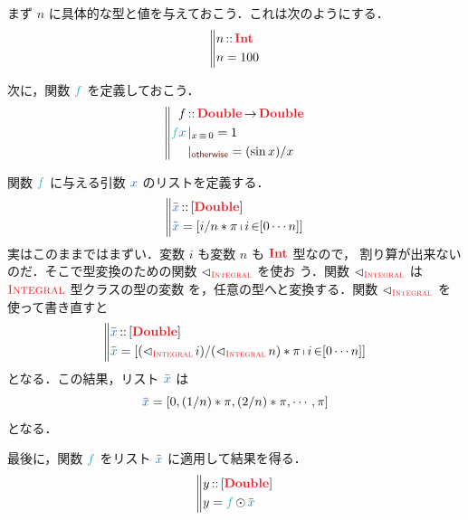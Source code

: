 \documentclass[a5paper,twoside,fleqn,draft]{jsbook}
\begin{document}
まず $n$ に具体的な型と値を与えておこう．これは次のようにする．
\begin{equation}
\left\mBrace
\begin{aligned}
n&\hIsTypeOf\hInt\\
n&=100
\end{aligned}
\right.
\end{equation}

次に，関数 $\hFunc{f}$ を定義しておこう．
\begin{equation}
\left\mBrace
\begin{aligned}
f&\hIsTypeOf\mProjEXP{\hDouble}{\hDouble}\\
\hFunc{f}\hVar{x}&\hGuard{x\hIfEq0}=1\\
&\hGuard{\hOtherwise}=(\sin x)/x
\end{aligned}
\right.
\end{equation}

関数 $\hFunc{f}$ に与える引数 $\hVar{x}$ のリストを定義する．
\begin{equation*}
  \left\mBrace
  \begin{aligned}
    \hListVarWith{x}
    &\hIsTypeOf{}[\hDouble]\\
    \hListVarWith{x}
    &=[i/n*\pi\mListComp i\mFrom[0\dotsb n]]
  \end{aligned}
  \right.
\end{equation*}
実はこのままではまずい．変数 $i$ も変数 $n$ も $\hInt$ 型なので，
割り算が出来ないのだ．そこで型変換のための関数 $\hFromIntegral$ を使お
う．関数 $\hFromIntegral$ は $\hIntegral$ 型クラスの型の変数
を，任意の型へと変換する．関数 $\hFromIntegral$ を使って書き直すと
\begin{equation}
  \left\mBrace
  \begin{aligned}
    \hListVarWith{x}
    &\hIsTypeOf{}[\hDouble]\\
    \hListVarWith{x}
    &=[(\hFromIntegral i)/(\hFromIntegral n)*\pi\mListComp i\mFrom[0\dotsb n]]
  \end{aligned}
  \right.
\end{equation}
となる．この結果，リスト $\hListVarWith{x}$ は
\begin{equation}
  \hListVarWith{x}
  =[0,(1/n)*\pi,(2/n)*\pi,\dotsb,\pi]
\end{equation}
となる．

最後に，関数 $\hFunc{f}$ をリスト $\hListVarWith{x}$ に適用して結果を得る．
\begin{equation}
  \left\mBrace
  \begin{aligned}
    y
    &\hIsTypeOf{}[\hDouble]\\
    y
    &=\hFunc{f}\mMapList\hListVarWith{x}
  \end{aligned}
  \right.
\end{equation}
\end{document}
